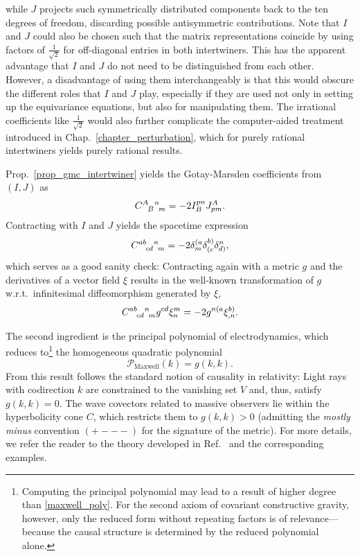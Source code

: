while $J$ projects such symmetrically distributed components back to the ten degrees of freedom, discarding possible antisymmetric contributions. Note that $I$ and $J$ could also be chosen such that the matrix representations coincide by using factors of $\frac{1}{\sqrt 2}$ for off-diagonal entries in both intertwiners. This has the apparent advantage that $I$ and $J$ do not need to be distinguished from each other. However, a disadvantage of using them interchangeably is that this would obscure the different roles that $I$ and $J$ play, especially if they are used not only in setting up the equivariance equations, but also for manipulating them. The irrational coefficients like $\frac{1}{\sqrt 2}$ would also further complicate the computer-aided treatment introduced in Chap.~\ref{chapter_perturbation}, which for purely rational intertwiners yields purely rational results.

Prop.~\ref{prop_gmc_intertwiner} yields the Gotay-Marsden coefficients from $(I,J)$ as
\begin{equation}
  \gmc{A}{B}{n}{m} = -2 I^{pn}_B J^A_{pm}.
\end{equation}
Contracting with $I$ and $J$ yields the spacetime expression
\begin{equation}
  \gmc{ab}{cd}{n}{m} = -2 \delta^{(a}_m \delta^{b)}_{(c} \delta^n_{d)},
\end{equation}
which serves as a good sanity check: Contracting again with a metric $g$ and the derivatives of a vector field $\xi$ results in the well-known transformation of $g$ w.r.t.~infinitesimal diffeomorphism generated by $\xi$,
\begin{equation}
  \gmc{ab}{cd}{n}{m} g^{cd} \xi^m_n = -2g^{n(a} \xi^{b)}_{,n}.
\end{equation}

The second ingredient is the principal polynomial of electrodynamics, which reduces to\footnote{Computing the principal polynomial may lead to a result of higher degree than \eqref{maxwell_poly}. For the second axiom of covariant constructive gravity, however, only the reduced form without repeating factors is of relevance---because the causal structure is determined by the reduced polynomial alone\cite{sergio}.} the homogeneous quadratic polynomial\cite{sergio?}
\begin{equation}\label{maxwell_poly}
  \mathcal P_\text{Maxwell}(k) = g(k,k).
\end{equation}
From this result follows the standard notion of causality in relativity: Light rays with codirection $k$ are constrained to the vanishing set $V$ and, thus, satisfy $g(k,k)=0$. The wave covectors related to massive observers lie within the hyperbolicity cone $C$, which restricts them to $g(k,k) > 0$ (admitting the \emph{mostly minus} convention $(+---)$ for the signature of the metric). For more details, we refer the reader to the theory developed in Ref.~\cite{sergio,closure paper,?} and the corresponding examples.

